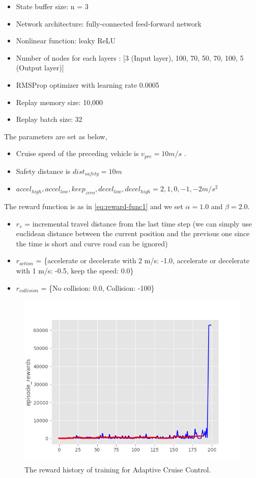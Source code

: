 \begin{itemize}
\item State buffer size: n = 3
\item Network architecture: fully-connected feed-forward network
\item Nonlinear function: leaky ReLU
\item Number of nodes for each layers : [3 (Input layer), 100, 70, 50, 70, 100, 5 (Output layer)]
\item RMSProp optimizer with learning rate 0.0005
\item Replay memory size: 10,000
\item Replay batch size: 32
\end{itemize}

The parameters are set as below,

\begin{itemize}
\item Cruise speed of the preceding vehicle is $v_{pre} = 10 m/s$ .
\item Safety distance is $dist_{safety} = 10 m$
\item $accel_{high}, accel_{low}, keep_{zero}, decel_{low}, decel_{high} = {2, 1, 0, -1, -2} m/s^2$
\end{itemize}

The reward function is as in \ref{eq:reward-func1} and we set $\alpha = 1.0$ and $\beta = 2.0$. 

\begin{itemize}
 \item $r_s$ = incremental travel distance from the last time step (we can simply use euclidean distance between the current position and the previous one since the time is short and curve road can be ignored)
 \item $r_{action}$ = \{accelerate or decelerate with 2 m/s: -1.0, accelerate or decelerate with 1 m/s: -0.5, keep the speed: 0.0\}
 \item $r_{collision}$ = \{No collision: 0.0, Collision: -100\}
\end{itemize}


\begin{figure}[h]
\centering
\includegraphics[width=1.0\textwidth]{figs/ch5/acc-reward}
\caption{The reward history of training for Adaptive Cruise Control.}
\label{fig:acc-reward}
\end{figure}

